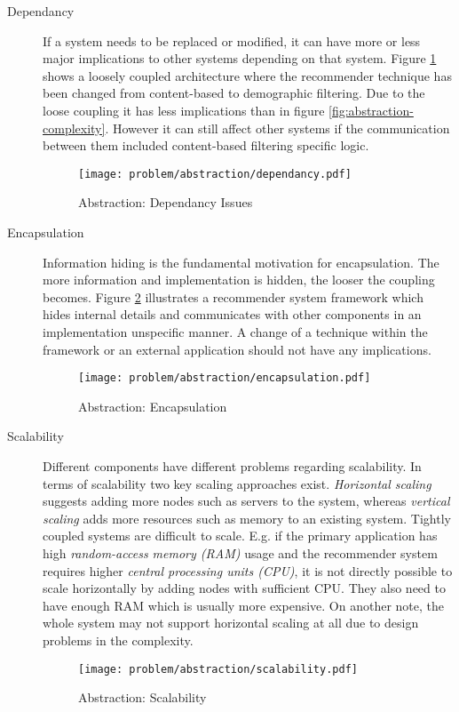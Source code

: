 \begin{description}
    \item[Dependancy] If a system needs to be replaced or modified, it can have more or less major implications to other systems depending on that system. Figure \ref{fig:abstraction-dependancy} shows a loosely coupled architecture where the recommender technique has been changed from content-based to demographic filtering. Due to the loose coupling it has less implications than in figure \ref{fig:abstraction-complexity}. However it can still affect other systems if the communication between them included content-based filtering specific logic.

    \begin{figure}[H]
        \texttt{[image: problem/abstraction/dependancy.pdf]}
        \caption{Abstraction: Dependancy Issues}
        \label{fig:abstraction-dependancy}
    \end{figure}

    \item[Encapsulation] Information hiding is the fundamental motivation for encapsulation. The more information and implementation is hidden, the looser the coupling becomes. Figure \ref{fig:abstraction-encapsulation} illustrates a recommender system framework which hides internal details and communicates with other components in an implementation unspecific manner. A change of a technique within the framework or an external application should not have any implications.

    \begin{figure}[H]
        \texttt{[image: problem/abstraction/encapsulation.pdf]}
        \caption{Abstraction: Encapsulation}
        \label{fig:abstraction-encapsulation}
    \end{figure}

    \item[Scalability] Different components have different problems regarding scalability. In terms of scalability two key scaling approaches exist. \emph{Horizontal scaling} suggests adding more nodes such as servers to the system, whereas \emph{vertical scaling} adds more resources such as memory to an existing system. Tightly coupled systems are difficult to scale. E.g. if the primary application has high \emph{random-access memory (RAM)} usage and the recommender system requires higher \emph{central processing units (CPU)}, it is not directly possible to scale horizontally by adding nodes with sufficient CPU. They also need to have enough RAM which is usually more expensive. On another note, the whole system may not support horizontal scaling at all due to design problems in the complexity. 

    \begin{figure}[H]
        \texttt{[image: problem/abstraction/scalability.pdf]}
        \caption{Abstraction: Scalability}
        \label{fig:abstraction-scalability}
    \end{figure}
\end{description}

